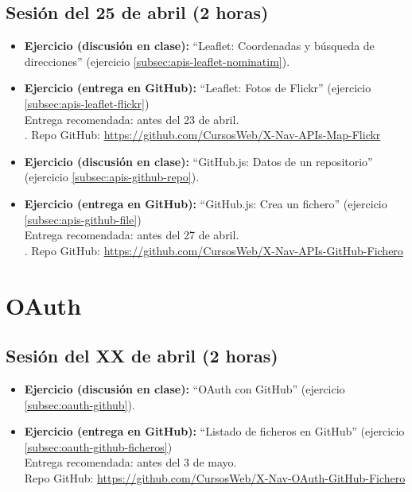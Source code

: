\documentclass[a4paper,12pt]{report}
\begin{document}
\subsection{Sesión del 25 de abril (2 horas)}

\begin{itemize}
\item \textbf{Ejercicio (discusión en clase):} ``Leaflet: Coordenadas y búsqueda de direcciones'' (ejercicio \ref{subsec:apis-leaflet-nominatim}).
\item \textbf{Ejercicio (entrega en GitHub):} ``Leaflet: Fotos de Flickr'' (ejercicio \ref{subsec:apis-leaflet-flickr})  \\
  Entrega recomendada: antes del 23 de abril. \\.
  Repo GitHub: \url{https://github.com/CursosWeb/X-Nav-APIs-Map-Flickr}
\item \textbf{Ejercicio (discusión en clase):} ``GitHub.js: Datos de un repositorio'' (ejercicio \ref{subsec:apis-github-repo}).
\item \textbf{Ejercicio (entrega en GitHub):} ``GitHub.js: Crea un fichero'' (ejercicio \ref{subsec:apis-github-file})  \\
  Entrega recomendada: antes del 27 de abril. \\.
  Repo GitHub: \url{https://github.com/CursosWeb/X-Nav-APIs-GitHub-Fichero}
\end{itemize}


\section{OAuth}

\subsection{Sesión del XX de abril (2 horas)}

\begin{itemize}
\item \textbf{Ejercicio (discusión en clase):} ``OAuth con GitHub'' (ejercicio \ref{subsec:oauth-github}).
\item \textbf{Ejercicio (entrega en GitHub):} ``Listado de ficheros en GitHub'' (ejercicio \ref{subsec:oauth-github-ficheros})  \\
  Entrega recomendada: antes del 3 de mayo. \\
  Repo GitHub: \url{https://github.com/CursosWeb/X-Nav-OAuth-GitHub-Fichero}
\end{itemize}
\end{document}

